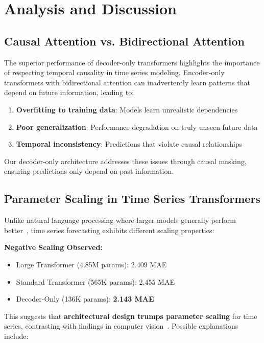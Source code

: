 \documentclass[11pt]{article}
\begin{document}
\section{Analysis and Discussion}

\subsection{Causal Attention vs. Bidirectional Attention}

The superior performance of decoder-only transformers highlights the importance of respecting temporal causality in time series modeling. Encoder-only transformers with bidirectional attention can inadvertently learn patterns that depend on future information, leading to:

\begin{enumerate}
\item \textbf{Overfitting to training data}: Models learn unrealistic dependencies
\item \textbf{Poor generalization}: Performance degradation on truly unseen future data
\item \textbf{Temporal inconsistency}: Predictions that violate causal relationships
\end{enumerate}

Our decoder-only architecture addresses these issues through causal masking, ensuring predictions only depend on past information.

\subsection{Parameter Scaling in Time Series Transformers}

Unlike natural language processing where larger models generally perform better~\cite{radford2019language,brown2020language}, time series forecasting exhibits different scaling properties:

\textbf{Negative Scaling Observed:}
\begin{itemize}
\item Large Transformer (4.85M params): 2.409 MAE
\item Standard Transformer (565K params): 2.455 MAE
\item Decoder-Only (136K params): \textbf{2.143 MAE}
\end{itemize}

This suggests that \textbf{architectural design trumps parameter scaling} for time series, contrasting with findings in computer vision~\cite{he2016deep}. Possible explanations include:
\end{document}
